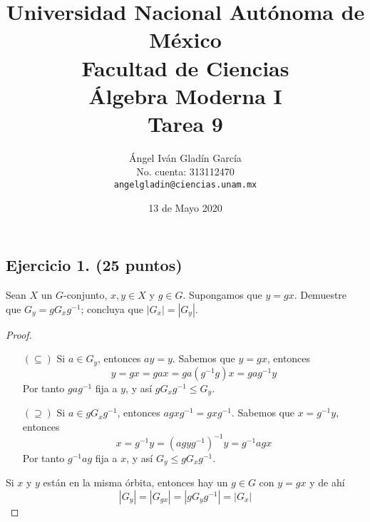 \documentclass[letterpaper]{article}
\begin{document}
\title{
    \vspace{-2.2em}
        Universidad Nacional Autónoma de México\\
        Facultad de Ciencias\\
        Álgebra Moderna I\\
    \vspace{.5cm}
    \large
        \textbf{Tarea 9}
}
\author{
    Ángel Iván Gladín García\\
    No. cuenta: 313112470\\
    \texttt{angelgladin@ciencias.unam.mx}
}
\date{13 de Mayo 2020}
\maketitle

\newtheorem{theorem}{Teorema}
\newtheorem{example}{Ejemplo}
\newtheorem{corollary}{Corolario}
\newtheorem{lemma}{Lemma}
\newtheorem{definition}{Definicion}
\newtheorem{prop}{Proposicion}

\subsection*{Ejercicio 1. (25 puntos)}
Sean $X$ un $G$-conjunto, $x, y \in X$ y $g \in G$. Supongamos que $y = gx$. Demuestre que
$G_y = gG_x g^{-1}$; concluya que $|G_x| = |G_y|$.

\begin{proof}
\hfill
\begin{itemize}
    \item[$(\subseteq)$]
    Si $a \in G_y$, entonces $a y = y$. Sabemos que $y = g x$, entonces
    \[
        y = g x = g a x = g a (g^{-1} g) x = g a g^{-1} y
    \]
    Por tanto $g a g^{-1}$ fija a $y$, y así $g G_x g^{-1} \leq G_y$.

    \item[$(\supseteq)$]
    Si $a \in g G_x g^{-1}$, entonces $agxg^{-1} = gxg^{-1}$. Sabemos que $x = g^{-1} y$, entonces
    \[
        x = g^{-1} y = (agyg^{-1})^{-1} y = g^{-1} a g x 
    \]
    Por tanto $g^{-1} a g$ fija a $x$, y así $G_y \leq g G_x g^{-1}$.
\end{itemize}
Si $x$ y $y$ están en la misma órbita, entonces hay un $g \in G$ con $y = gx$ y de ahí
\[
    |G_y| = |G_{gx}| = |g G_y g^{-1}| = |G_x|
\]
\end{proof}
\end{document}
